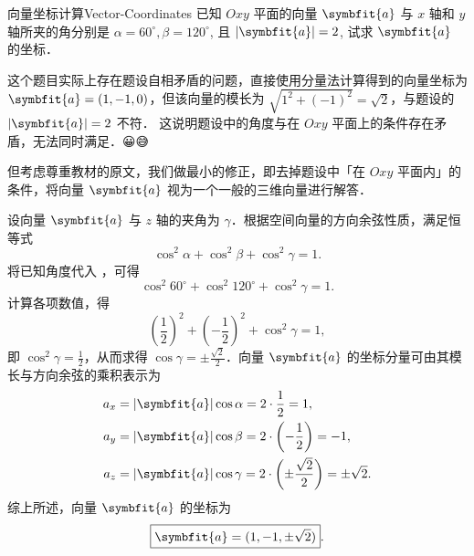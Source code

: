\begin{problem}{向量坐标计算}{Vector-Coordinates}
    已知 $Oxy$ 平面的向量 $\symbfit{a}$ 与 $x$ 轴和 $y$ 轴所夹的角分别是 $\alpha = 60^\circ, \beta = 120^\circ$, 且 $|\symbfit{a}| = 2$, 试求 $\symbfit{a}$ 的坐标．
\end{problem}

\begin{note}{}{}
    这个题目实际上存在题设自相矛盾的问题，直接使用分量法计算得到的向量坐标为 $\symbfit{a} = (1, -1, 0)$，但该向量的模长为 $\sqrt{1^2 + (-1)^2} = \sqrt{2}$，与题设的 $|\symbfit{a}| = 2$ 不符．
    这说明题设中的角度与在 $Oxy$ 平面上的条件存在矛盾，无法同时满足．{\emojifont 😀😅}

    但考虑尊重教材的原文，我们做最小的修正，即去掉题设中「在 $Oxy$ 平面内」的条件，将向量 $\symbfit{a}$ 视为一个一般的三维向量进行解答．
\end{note}

\begin{solution}
    设向量 $\symbfit{a}$ 与 $z$ 轴的夹角为 $\gamma$．根据空间向量的方向余弦性质，满足恒等式
    \begin{equation}
        \cos^2 \alpha + \cos^2 \beta + \cos^2 \gamma = 1. \label{eq:direction-cosine-1}
    \end{equation}
    将已知角度代入 ，可得
    \begin{equation}
        \cos^2 60^\circ + \cos^2 120^\circ + \cos^2 \gamma = 1.
    \end{equation}
    计算各项数值，得
    \begin{equation}
        \left( \frac{1}{2} \right)^2 + \left( -\frac{1}{2} \right)^2 + \cos^2 \gamma = 1,
    \end{equation}
    即 $\cos^2 \gamma = \frac{1}{2}$，从而求得 $\cos \gamma = \pm \frac{\sqrt{2}}{2}$．向量 $\symbfit{a}$ 的坐标分量可由其模长与方向余弦的乘积表示为
    \begin{equation}
        \begin{aligned}
            a_x & = |\symbfit{a}| \cos \alpha = 2 \cdot \frac{1}{2} = 1,                                      \\
            a_y & = |\symbfit{a}| \cos \beta = 2 \cdot \left( -\frac{1}{2} \right) = -1,                      \\
            a_z & = |\symbfit{a}| \cos \gamma = 2 \cdot \left( \pm \frac{\sqrt{2}}{2} \right) = \pm \sqrt{2}.
        \end{aligned}
    \end{equation}
    综上所述，向量 $\symbfit{a}$ 的坐标为
    \begin{equation}
        \boxed{\symbfit{a} = (1, -1, \pm \sqrt{2})}.
    \end{equation}
\end{solution}


